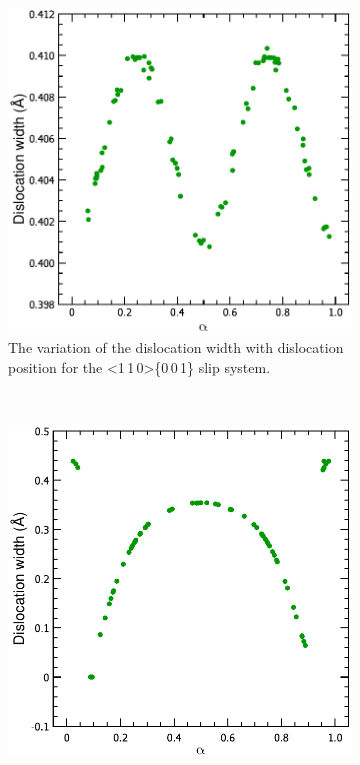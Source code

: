 \begin{figure}
\centering
\begin{subfigure}{0.4\textwidth}
\centering
\includegraphics[width=\textwidth]{NaCl_110_001_w_vs_a}
\caption{The variation of the dislocation width with dislocation position for the <1\,1\,0>\{0\,0\,1\} slip system. \label{fig:NaCl_110_001_w_variation}}
\end{subfigure}
~
\begin{subfigure}{0.4\textwidth}
\centering
\includegraphics[width=\textwidth]{NaCl_110_110_w_vs_a}

\end{subfigure}
\end{figure}
